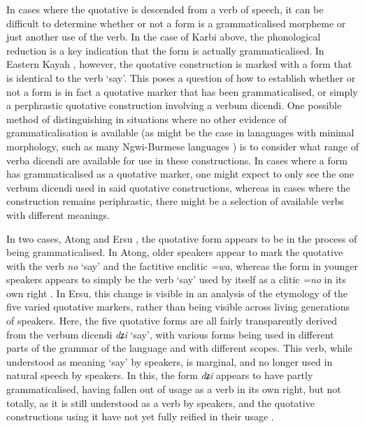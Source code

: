 In cases where the quotative is descended from a verb of speech, it can be difficult to determine whether or not a form is a grammaticalised morpheme or just another use of the verb. In the case of Karbi above, the phonological reduction is a key indication that the form is actually grammaticalised. In Eastern Kayah \cite[Karenic: Myanmar,][]{Solnit1986}, however, the quotative construction is marked with a form that is identical to the verb `say'. This poses a question of how to establish whether or not a form is in fact a quotative marker that has been grammaticalised, or simply a perphrastic quotative construction involving a verbum dicendi. One possible method of distinguishing in situations where no other evidence of grammaticalisation is available (as might be the case in lanaguages with minimal morphology, such as many Ngwi-Burmese languages ) is to consider what range of verba dicendi are available for use in these constructions. In cases where a form has grammaticalised as a quotative marker, one might expect to only see the one verbum dicendi used in said quotative constructions, whereas in cases where the construction remains periphrastic, there might be a selection of available verbs with different meanings.

In two cases, Atong \cite[Brahmaputran: India,][]{Breugel2014} and Ersu \cite[Ersuish: PRC,][]{Zhang2013}, the quotative form appears to be in the process of being grammaticalised. In Atong, older speakers appear to mark the quotative with the verb \textit{no} `say' and the factitive enclitic \textit{=wa}, whereas the form in younger speakers appears to simply be the verb `say' used by itself as a clitic \textit{=no} in its own right \cite[408]{Breugel2014}. In Ersu, this change is visible in an analysis of the etymology of the five varied quotative markers, rather than being visible across living generations of speakers. Here, the five quotative forms are all fairly transparently derived from the verbum dicendi \textit{dʑi} `say', with various forms being used in different parts of the grammar of the language and with different scopes. This verb, while understood as meaning `say' by speakers, is marginal, and no longer used in natural speech by speakers. In this, the form \textit{dʑi} appears to have partly grammaticalised, having fallen out of usage as a verb in its own right, but not totally, as it is still understood as a verb by speakers, and the quotative constructions using it have not yet fully reified in their usage \cite{Zhang2014}.

